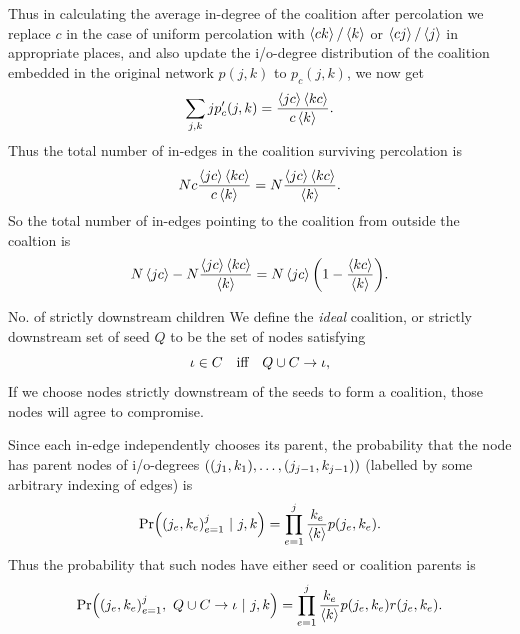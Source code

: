 \documentclass[10pt]{beamer}
\begin{document}
\begin{frame}
Thus in calculating the average in-degree of the coalition after percolation we replace $c$ in the case of uniform percolation with $\expval{ck}/\expval{k}$ or $\expval{cj}/\expval{j}$ in appropriate places, and also update the i/o-degree distribution of the coalition embedded in the original network $p(j,k)$ to $p_c(j,k)$, we now get
\begin{equation}
\sum_{j,k} j p_c'(j,k) = \frac{\expval{jc}\expval{kc}}{c\expval{k}}.
\end{equation}
Thus the total number of in-edges in the coalition surviving percolation is
\begin{equation}
Nc \frac{\expval{jc}\expval{kc}}{c\expval{k}} = N\frac{\expval{jc}\expval{kc}}{\expval{k}}.
\end{equation}
So the total number of in-edges pointing to the coalition from outside the coaltion is
\begin{equation}
 N\expval{jc} - N\frac{\expval{jc}\expval{kc}}{\expval{k}} = N\expval{jc}\qty(1-\frac{\expval{kc}}{\expval{k}}).
\end{equation}
\end{frame}

\begin{frame}{No. of strictly downstream children}
We define the \emph{ideal} coalition, or strictly downstream set of seed $Q$ to be the set of nodes satisfying
\begin{equation}
\iota \in C \qq{iff} Q \cup C \to \iota,
\end{equation}
If we choose nodes strictly downstream of the seeds to form a coalition, those nodes will agree to compromise.
\end{frame}
\begin{frame}
Since each in-edge independently chooses its parent, the probability that the node has parent nodes of i/o-degrees $\qty((j_1, k_1), \ldots, (j_{j-1}, k_{j-1}))$ (labelled by some arbitrary indexing of edges) is
\begin{equation}
\Pr(\qty(j_e, k_e)_{e=1}^{j} \ \lvert \ j,k) = \prod_{e=1}^j\frac{k_e}{\expval{k}} p(j_e, k_e).
\end{equation}
Thus the probability that such nodes have either seed or coalition parents is
\begin{equation}
\Pr(\qty(j_e, k_e)_{e=1}^{j},\ Q\cup C \to \iota \ \lvert \ j,k) = \prod_{e=1}^j\frac{k_e}{\expval{k}} p(j_e, k_e)r(j_e, k_e).
\end{equation}
\end{frame}
\end{document}

